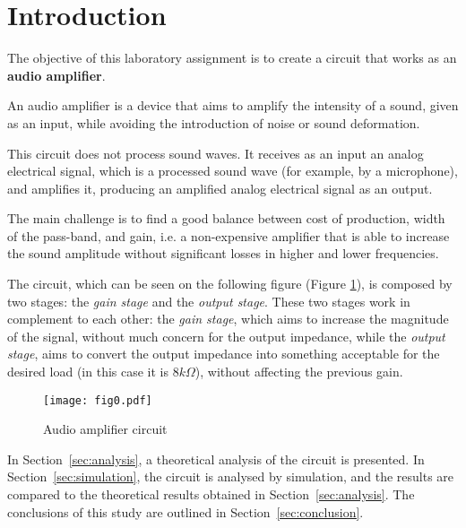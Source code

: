 \section{Introduction}
\label{sec:introduction}


\indent

The objective of this laboratory assignment is to create a circuit that works as an {\bf audio amplifier}. 

An audio amplifier is a device that aims to amplify the intensity of a sound, given as an input, while avoiding the introduction of noise or sound deformation. 

This circuit does not process sound waves. It receives as an input an analog electrical signal, which is a processed sound wave (for example, by a microphone), and amplifies it, producing an amplified analog electrical signal as an output. 

The main challenge is to find a good balance between cost of production, width of the pass-band, and gain, i.e. a non-expensive amplifier that is able to increase the sound amplitude without significant losses in higher and lower frequencies. 

The circuit, which can be seen on the following figure (Figure \ref{fig:schematic}), is composed by two stages: the \textit{gain stage} and the \textit{output stage}. 
These two stages work in complement to each other: the \textit{gain stage}, which aims to increase the magnitude of the signal, without much concern for the output impedance, while the \textit{output stage}, aims to convert the output impedance into something acceptable for the desired load (in this case it is $8 k\Omega$), without affecting the previous gain.


\begin{figure}[h!]
    \centering
    \texttt{[image: fig0.pdf]}
    \caption{Audio amplifier circuit}
    \label{fig:schematic}
\end{figure}

In Section~\ref{sec:analysis}, a theoretical analysis of the circuit is
presented. In Section~\ref{sec:simulation}, the circuit is analysed by
simulation, and the results are compared to the theoretical results obtained in Section~\ref{sec:analysis}. The conclusions of this study are outlined in Section~\ref{sec:conclusion}.
